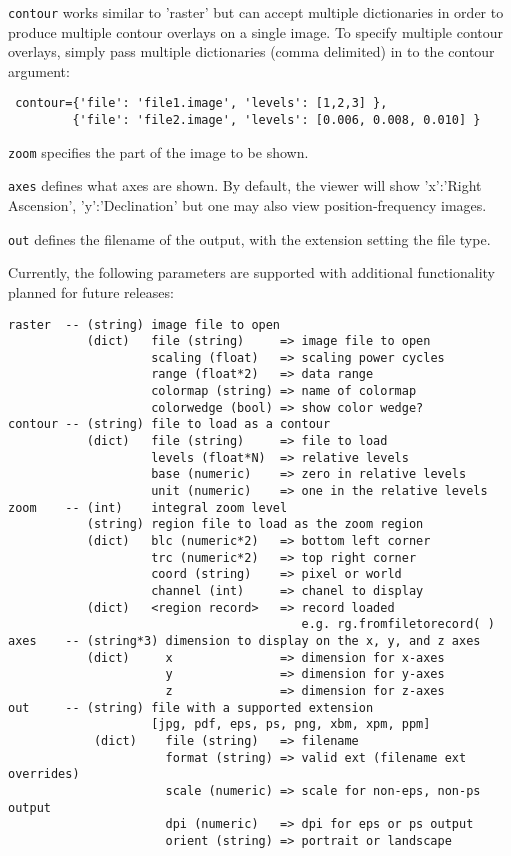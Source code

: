 {\tt contour} works similar to 'raster' but can accept multiple dictionaries in order to produce
multiple contour overlays on a single image. To specify multiple contour overlays, simply 
pass multiple dictionaries (comma delimited) in to the contour argument:

\small
\begin{verbatim}
 contour={'file': 'file1.image', 'levels': [1,2,3] },
         {'file': 'file2.image', 'levels': [0.006, 0.008, 0.010] }
\end{verbatim}
\normalsize

{\tt zoom} specifies the part of the image to be shown.

{\tt axes} defines what axes are shown. By default, the viewer 
will show 'x':'Right Ascension', 'y':'Declination' but one may also
view position-frequency images. 

{\tt out} defines the filename of the output, with the extension setting the file type. 

Currently, the following parameters are supported with additional functionality
planned for future releases:

\small
\begin{verbatim}
raster  -- (string) image file to open
           (dict)   file (string)     => image file to open
                    scaling (float)   => scaling power cycles
                    range (float*2)   => data range
                    colormap (string) => name of colormap
                    colorwedge (bool) => show color wedge?
contour -- (string) file to load as a contour
           (dict)   file (string)     => file to load
                    levels (float*N)  => relative levels
                    base (numeric)    => zero in relative levels
                    unit (numeric)    => one in the relative levels
zoom    -- (int)    integral zoom level
           (string) region file to load as the zoom region
           (dict)   blc (numeric*2)   => bottom left corner
                    trc (numeric*2)   => top right corner
                    coord (string)    => pixel or world
                    channel (int)     => chanel to display
           (dict)   <region record>   => record loaded
                                         e.g. rg.fromfiletorecord( )
axes    -- (string*3) dimension to display on the x, y, and z axes
           (dict)     x               => dimension for x-axes
                      y               => dimension for y-axes
                      z               => dimension for z-axes
out     -- (string) file with a supported extension
                    [jpg, pdf, eps, ps, png, xbm, xpm, ppm]
            (dict)    file (string)   => filename
                      format (string) => valid ext (filename ext overrides)
                      scale (numeric) => scale for non-eps, non-ps output
                      dpi (numeric)   => dpi for eps or ps output
                      orient (string) => portrait or landscape
\end{verbatim}
\normalsize

